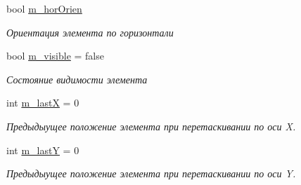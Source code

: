 \begin{DoxyCompactItemize}
bool \hyperlink{class_interface_element_class_a029cdb3ead496730b2aac67d0f22ba34}{m\+\_\+hor\+Orien}
\begin{DoxyCompactList}\small\item\em Ориентация элемента по горизонтали \end{DoxyCompactList}\item 
bool \hyperlink{class_interface_element_class_a734e2f12d7ca918619dda46ac2c4e56e}{m\+\_\+visible} = false
\begin{DoxyCompactList}\small\item\em Состояние видимости элемента \end{DoxyCompactList}\item 
int \hyperlink{class_interface_element_class_aa543f71120067c5cb3f4208a6e0fe3aa}{m\+\_\+lastX} = 0
\begin{DoxyCompactList}\small\item\em Предыдыущее положение элемента при перетаскивании по оси X. \end{DoxyCompactList}\item 
int \hyperlink{class_interface_element_class_abbd9a7e0ff18d4bb41d01aad1653f167}{m\+\_\+lastY} = 0
\begin{DoxyCompactList}\small\item\em Предыдыущее положение элемента при перетаскивании по оси Y. \end{DoxyCompactList}\end{DoxyCompactItemize}
